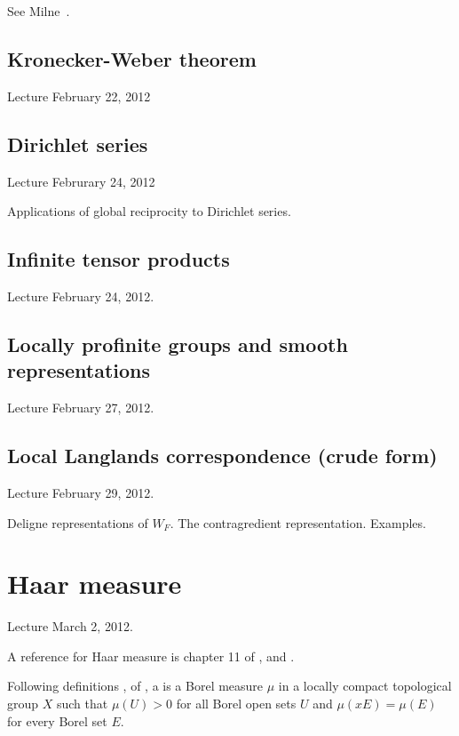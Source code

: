 \documentclass{amsart}
\begin{document}
See Milne~\cite[p. 154, 3.8,~Ex~3.9]{CFT}.

\subsection{Kronecker-Weber theorem}

Lecture February 22, 2012

\subsection{Dirichlet series}

Lecture Februrary 24, 2012

Applications of global reciprocity to Dirichlet series.

\subsection{Infinite tensor products}

Lecture February 24, 2012.

\subsection{Locally profinite groups and smooth representations}

Lecture February 27, 2012.

\subsection{Local Langlands correspondence (crude form)}

Lecture February 29, 2012.

Deligne representations of $W_F$.  The contragredient representation.  Examples.


\newpage
\section{Haar measure}

Lecture March 2, 2012.

A reference for Haar measure is chapter 11 of \cite{Halmos-measure}, and
\cite[sec. 3]{bushnell-henniart}.   

Following definitions , 
of \cite{Halmos-measure},
a  is a Borel measure $\mu$ in a locally compact
topological group $X$ such that $\mu(U)>0$ for all Borel open sets $U$
and $\mu(x E) =\mu(E)$ for every Borel set $E$.
\end{document}
